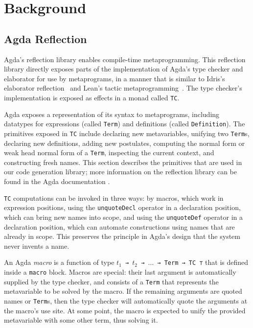 \documentclass[sigplan,10pt]{acmart}
\begin{document}
\section{Background}
\label{sec:sec2}

\subsection{Agda Reflection}
\label{sec:sec2.1}
Agda's reflection library enables compile-time metaprogramming.
This reflection library directly exposes parts of the implementation of Agda's type checker and elaborator for use by metaprograms, in a manner that is similar to Idris's elaborator reflection~\citep{davidphd,David-2016} and Lean's tactic metaprogramming~\citep{Ebner2017}.
The type checker's implementation is exposed as effects in a monad called \texttt{TC}.

Agda exposes a representation of its syntax to metaprograms, including datatypes for expressions (called \texttt{Term}) and definitions (called \texttt{Definition}).
The primitives exposed in \texttt{TC} include declaring new metavariables, unifying two \texttt{Term}s, declaring new definitions, adding new postulates, computing the normal form or weak head normal form of a \texttt{Term}, inspecting the current context, and constructing fresh names.
This section describes the primitives that are used in our code generation library; more information on the reflection library can be found in the Agda documentation \cite{Agda-doc-2017}.

\texttt{TC} computations can be invoked in three ways: by macros, which work in expression positions, using the \texttt{unquoteDecl} operator in a declaration position, which can bring new names into scope, and using the \texttt{unquoteDef} operator in a declaration position, which can automate constructions using names that are already in scope.
This preserves the principle in Agda's design that the system never invents a name.

An Agda \emph{macro} is a function of type {\tt $t_1$ → $t_2$ → $\ldots$ → Term → TC ⊤} that is defined inside a \texttt{macro} block.
Macros are special: their last argument is automatically supplied by the type checker, and consists of a \texttt{Term} that represents the metavariable to be solved by the macro.
If the remaining arguments are quoted names or \texttt{Term}s, then the type checker will automatically quote the arguments at the macro's use site.
At some point, the macro is expected to unify the provided metavariable with some other term, thus solving it.
\end{document}
